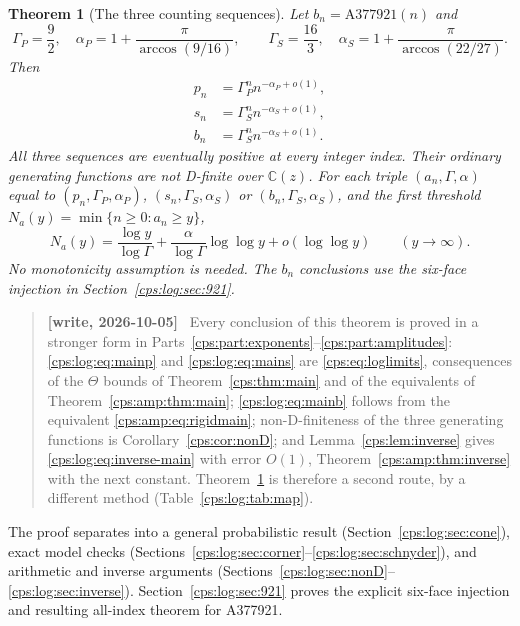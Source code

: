 \documentclass[11pt,letterpaper]{article}
\numberwithin{equation}{section}
\newtheorem{theorem}{Theorem}[section]
\theoremstyle{remark}\newtheorem{remark}[theorem]{Remark}
\newenvironment{writenotelog}{\begin{quote}\small\sloppy\textbf{[write, 2026-10-05]}\ }{\end{quote}}
\newcommand{\gp}{\Gamma_P}\newcommand{\gs}{\Gamma_S}
\newcommand{\ap}{\alpha_P}\newcommand{\as}{\alpha_S}
\begin{document}
\begin{theorem}[The three counting sequences]\label{cps:log:thm:main}
Let $b_n=\mathrm{A377921}(n)$ and
\[
 \gp=\frac92,\quad \ap=1+\frac\pi{\arccos(9/16)},\qquad
 \gs=\frac{16}3,\quad \as=1+\frac\pi{\arccos(22/27)}.
\]
Then
\begin{align}
 p_n&=\gp^n n^{-\ap+o(1)},\label{cps:log:eq:mainp}\\
 s_n&=\gs^n n^{-\as+o(1)},\label{cps:log:eq:mains}\\
 b_n&=\gs^n n^{-\as+o(1)}.\label{cps:log:eq:mainb}
\end{align}
All three sequences are eventually positive at every integer index. Their
ordinary generating functions are not D-finite over $\mathbb C(z)$.
For each triple $(a_n,\Gamma,\alpha)$ equal to
$(p_n,\gp,\ap)$, $(s_n,\gs,\as)$ or $(b_n,\gs,\as)$, and the first threshold
$N_a(y)=\min\{n\ge0:a_n\ge y\}$,
\begin{equation}\label{cps:log:eq:inverse-main}
 N_a(y)=\frac{\log y}{\log\Gamma}
       +\frac{\alpha}{\log\Gamma}\log\log y
       +o(\log\log y)\qquad(y\to\infty).
\end{equation}
No monotonicity assumption is needed.
The $b_n$ conclusions use the six-face injection in Section~\ref{cps:log:sec:921}.
\end{theorem}

\begin{writenotelog}
Every conclusion of this theorem is proved in a stronger form in
Parts~\ref{cps:part:exponents}--\ref{cps:part:amplitudes}: \eqref{cps:log:eq:mainp} and
\eqref{cps:log:eq:mains} are \eqref{cps:eq:loglimits}, consequences of the $\Theta$ bounds of
Theorem~\ref{cps:thm:main} and of the equivalents of Theorem~\ref{cps:amp:thm:main};
\eqref{cps:log:eq:mainb} follows from the equivalent \eqref{cps:amp:eq:rigidmain}; non-D-finiteness
of the three generating functions is Corollary~\ref{cps:cor:nonD}; and Lemma~\ref{cps:lem:inverse}
gives \eqref{cps:log:eq:inverse-main} with error $O(1)$, Theorem~\ref{cps:amp:thm:inverse} with the
next constant. Theorem~\ref{cps:log:thm:main} is therefore a second route, by a different method
(Table~\ref{cps:log:tab:map}).
\end{writenotelog}

The proof separates into a general probabilistic result
(Section~\ref{cps:log:sec:cone}), exact model checks
(Sections~\ref{cps:log:sec:corner}--\ref{cps:log:sec:schnyder}), and arithmetic and inverse
arguments (Sections~\ref{cps:log:sec:nonD}--\ref{cps:log:sec:inverse}). Section~\ref{cps:log:sec:921}
proves the explicit six-face injection and resulting all-index theorem
for A377921.
\end{document}
